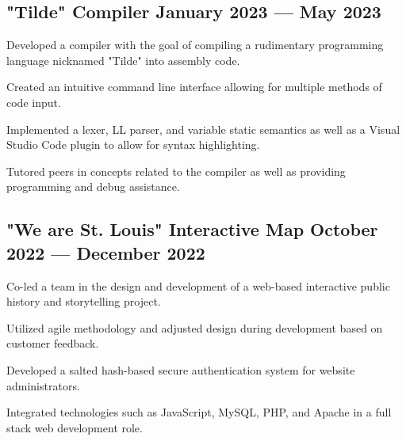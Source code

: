 
\subsection{{"Tilde" Compiler \hfill January 2023 --- May 2023}}
\begin{zitemize}
\item Developed a compiler with the goal of compiling a rudimentary programming language nicknamed "Tilde" into assembly code.
\item Created an intuitive command line interface allowing for multiple methods of code input.
\item Implemented a lexer, LL parser, and variable static semantics as well as a Visual Studio Code plugin to allow for syntax highlighting.
\item Tutored peers in concepts related to the compiler as well as providing programming and debug assistance.
\end{zitemize}


\subsection{{"We are St. Louis" Interactive Map \hfill October 2022 --- December 2022}}
\begin{zitemize}
\item Co-led a team in the design and development of a web-based interactive public history and storytelling project.
\item Utilized agile methodology and adjusted design during development based on customer feedback.
\item Developed a salted hash-based secure authentication system for website administrators.
\item Integrated technologies such as JavaScript, MySQL, PHP, and Apache in a full stack web development role.
\end{zitemize}

